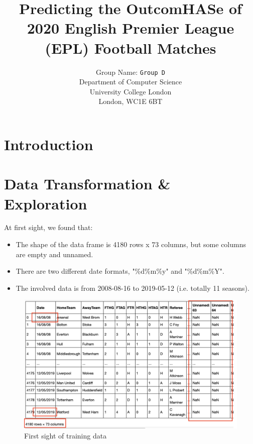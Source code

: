 \documentclass{article}
\title{Predicting the OutcomHASe of 2020 English Premier League (EPL) Football Matches}
\author{
 Group Name: \texttt{Group D}\\
  Department of Computer Science\\
  University College London\\
  London, WC1E 6BT\\
}
\begin{document}
\maketitle
{}


\section{Introduction }


\section{Data Transformation \& Exploration}

At first sight, we found that:
\begin{itemize}
\item The shape of the data frame is 4180 rows x 73 columns, but some columns are empty and unnamed.
\item There are two different date formats, "\%d\/\%m\/\%y" and "\%d\/\%m\/\%Y".
\item The involved data is from 2008-08-16 to 2019-05-12 (i.e. totally 11 seasons).
\end{itemize}

\begin{figure}[ht]
\centering
\includegraphics[scale=0.4]{graphs/firstSight.png}
\caption{ First sight of training data}
\label{fig:firstSight}
\end{figure}

\end{document}
